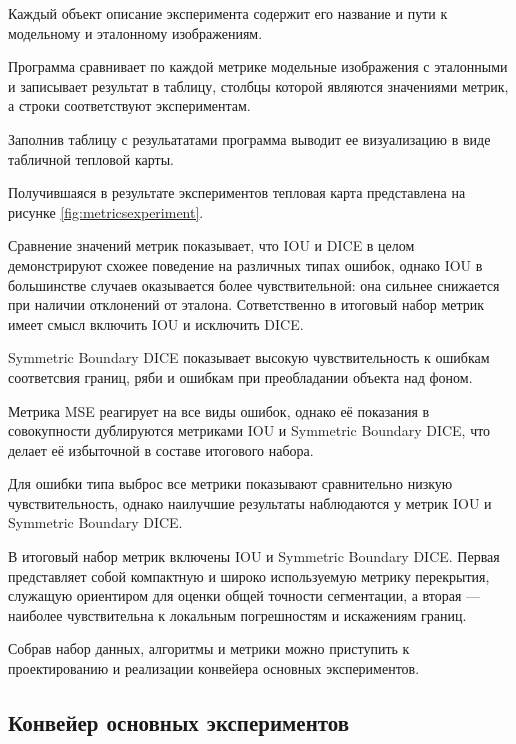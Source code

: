 Каждый объект описание эксперимента содержит его название и пути к модельному и эталонному изображениям.

Программа сравнивает по каждой метрике модельные изображения с эталонными и записывает результат в таблицу, столбцы которой являются значениями метрик, а строки соответствуют экспериментам.

Заполнив таблицу с резульататами программа выводит ее визуализацию в виде табличной тепловой карты.

Получившаяся в результате экспериментов тепловая карта представлена на рисунке \ref{fig:metricsexperiment}.


Сравнение значений метрик показывает, что IOU и DICE в целом демонстрируют схожее поведение на различных типах ошибок, однако IOU в большинстве случаев оказывается более чувствительной: она сильнее снижается при наличии отклонений от эталона. Сответственно в итоговый набор метрик имеет  смысл включить IOU и исключить DICE.

Symmetric Boundary DICE показывает высокую чувствительность к ошибкам соответсвия границ, ряби и ошибкам при преобладании объекта над фоном. 

Метрика MSE реагирует на все виды ошибок, однако её показания в совокупности дублируются метриками IOU и Symmetric Boundary DICE, что делает её избыточной в составе итогового набора.

Для ошибки типа выброс все метрики показывают сравнительно низкую чувствительность, однако наилучшие результаты наблюдаются у метрик IOU и Symmetric Boundary DICE.

В итоговый набор метрик включены IOU и Symmetric Boundary DICE. Первая представляет собой компактную и широко используемую метрику перекрытия, служащую ориентиром для оценки общей точности сегментации, а вторая — наиболее чувствительна к локальным погрешностям и искажениям границ.

Собрав набор данных, алгоритмы и метрики можно приступить к проектированию и реализации конвейера основных экспериментов.

\subsection{Конвейер основных экспериментов}

